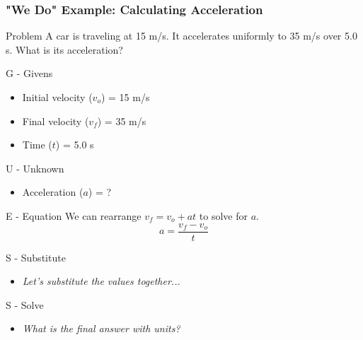 \documentclass{beamer}
\begin{document}
\begin{frame}[allowframebreaks]
\frametitle{"We Do" Example: Calculating Acceleration}
\begin{block}{Problem}
A car is traveling at 15 m/s. It accelerates uniformly to 35 m/s over 5.0 s. What is its acceleration?
\end{block}

\begin{alertblock}{G - Givens}
\begin{itemize}
    \item Initial velocity ($v_o$) = 15 m/s
    \item Final velocity ($v_f$) = 35 m/s
    \item Time ($t$) = 5.0 s
\end{itemize}
\end{alertblock}

\begin{alertblock}{U - Unknown}
\begin{itemize}
    \item Acceleration ($a$) = ?
\end{itemize}
\end{alertblock}

\begin{alertblock}{E - Equation}
We can rearrange $v_f = v_o + at$ to solve for $a$.
\begin{equation*}
a = \frac{v_f - v_o}{t}
\end{equation*}
\end{alertblock}

\begin{alertblock}{S - Substitute}
\begin{itemize}
    \item \textit{Let's substitute the values together...}
\end{itemize}
\end{alertblock}

\begin{alertblock}{S - Solve}
\begin{itemize}
    \item \textit{What is the final answer with units?}
\end{itemize}
\end{alertblock}
\end{frame}
\end{document}

